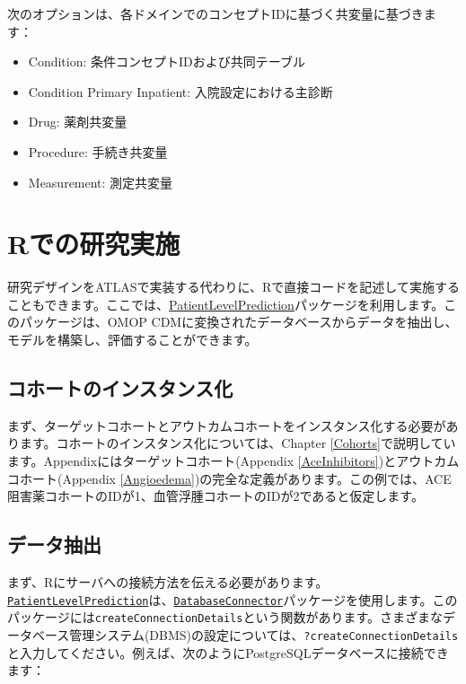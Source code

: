\documentclass[
  11pt]{book}
\providecommand{\tightlist}{%
  \setlength{\itemsep}{0pt}\setlength{\parskip}{0pt}}
\theoremstyle{definition}
\theoremstyle{definition}
\theoremstyle{definition}
\theoremstyle{definition}
\theoremstyle{remark}
\begin{document}
次のオプションは、各ドメインでのコンセプトIDに基づく共変量に基づきます：

\begin{itemize}
\tightlist
\item
  Condition: 条件コンセプトIDおよび共同テーブル
\item
  Condition Primary Inpatient: 入院設定における主診断
\item
  Drug: 薬剤共変量
\item
  Procedure: 手続き共変量
\item
  Measurement: 測定共変量
\end{itemize}

\section{Rでの研究実施}\label{rux3067ux306eux7814ux7a76ux5b9fux65bd}

研究デザインをATLASで実装する代わりに、Rで直接コードを記述して実施することもできます。ここでは、\href{https://ohdsi.github.io/PatientLevelPrediction/}{PatientLevelPrediction}パッケージを利用します。このパッケージは、OMOP CDMに変換されたデータベースからデータを抽出し、モデルを構築し、評価することができます。

\subsection{コホートのインスタンス化}\label{ux30b3ux30dbux30fcux30c8ux306eux30a4ux30f3ux30b9ux30bfux30f3ux30b9ux5316-1}

まず、ターゲットコホートとアウトカムコホートをインスタンス化する必要があります。コホートのインスタンス化については、Chapter \ref{Cohorts}で説明しています。Appendixにはターゲットコホート(Appendix \ref{AceInhibitors})とアウトカムコホート(Appendix \ref{Angioedema})の完全な定義があります。この例では、ACE阻害薬コホートのIDが1、血管浮腫コホートのIDが2であると仮定します。

\subsection{データ抽出}\label{ux30c7ux30fcux30bfux62bdux51fa-3}

まず、Rにサーバへの接続方法を伝える必要があります。\href{https://ohdsi.github.io/PatientLevelPrediction/}{\texttt{PatientLevelPrediction}}は、\href{https://ohdsi.github.io/DatabaseConnector/}{\texttt{DatabaseConnector}}パッケージを使用します。このパッケージには\texttt{createConnectionDetails}という関数があります。さまざまなデータベース管理システム(DBMS)の設定については、\texttt{?createConnectionDetails}と入力してください。例えば、次のようにPostgreSQLデータベースに接続できます：
\end{document}
